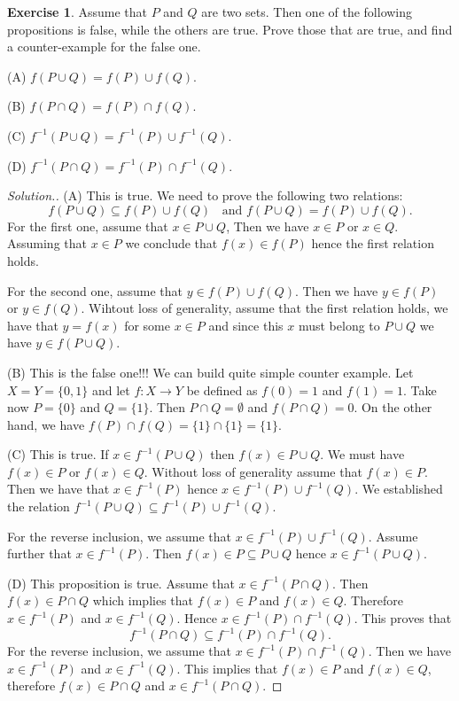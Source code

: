 \documentclass[11pt]{article}
\theoremstyle{definition}
\newtheorem{exer}[thm]{Exercise}
\theoremstyle{plain}
\begin{document}
\begin{exer}
Assume that \( P \) and \( Q \) are two sets. Then one of the following propositions is false, while the others are true. Prove those that are true, and find a counter-example for the false one.

(A) \( f(P \cup Q)=f(P)\cup f(Q) \).

(B) \( f(P\cap Q)=f(P)\cap f(Q) \).

(C) \( f^{-1}(P \cup Q)=f^{-1}(P)\cup f^{-1}(Q) \).

(D) \( f^{-1}(P\cap Q)=f^{-1}(P)\cap f^{-1}(Q) \).
\end{exer}
\begin{proof}[Solution.]
(A) This is true. We need to prove the following two relations: \[ f(P\cup Q)\subseteq f(P)\cup f(Q)\;\;\mbox{ and }f(P\cup Q)=f(P)\cup f(Q).\] For the first one, assume that \( x\in P\cup Q \), Then we have \( x\in P \) or \( x\in Q \). Assuming that \( x\in P \) we conclude that \( f(x)\in f(P) \) hence the first relation holds.

For the second one, assume that \( y\in f(P)\cup f(Q) \). Then we have \( y\in f(P) \) or \( y\in f(Q) \). Wihtout loss of generality, assume that the first relation holds, we have that \( y=f(x) \) for some \( x\in P \) and since this \( x \) must belong to \( P\cup Q \) we have \( y\in f(P\cup Q) \).

(B) This is the false one!!! We can build quite simple counter example. Let \( X=Y=\{0,1\} \) and let \( f:X\to Y \) be defined as \( f(0)=1 \) and \( f(1)=1 \). Take now \( P=\{0\} \) and \( Q=\{1\} \). Then \( P\cap Q=\emptyset \) and \( f(P\cap Q)=0 \). On the other hand, we have \( f(P)\cap f(Q)=\{1\}\cap \{1\}=\{1\} \).

(C) This is true. If \( x\in f^{-1}(P\cup Q) \) then \( f(x)\in P\cup Q \). We must have \( f(x)\in P \) or \( f(x)\in Q \). Without loss of generality assume that \( f(x)\in P \). Then we have that \( x\in f^{-1}(P) \) hence \( x\in f^{-1}(P)\cup f^{-1}(Q) \). We established the relation \( f^{-1}(P\cup Q)\subseteq f^{-1}(P)\cup f^{-1}(Q) \).

For the reverse inclusion, we assume that \( x\in f^{-1}(P)\cup f^{-1}(Q) \). Assume further that \( x\in f^{-1}(P) \). Then \( f(x)\in P\subseteq P\cup Q \) hence \( x\in f^{-1}(P\cup Q) \).

(D) This proposition is true. Assume that \( x\in f^{-1}(P\cap Q) \). Then \( f(x)\in P\cap Q \) which implies that \( f(x)\in P \) and \( f(x)\in Q \). Therefore \( x\in f^{-1}(P) \) and \( x\in f^{-1}(Q) \). Hence \( x\in f^{-1}(P)\cap f^{-1}(Q) \). This proves that \[ f^{-1}(P\cap Q)\subseteq f^{-1}(P)\cap f^{-1}(Q).\] For the reverse inclusion, we assume that \( x\in f^{-1}(P)\cap f^{-1}(Q) \). Then we have \( x\in f^{-1}(P) \) and \( x\in f^{-1}(Q) \). This implies that \( f(x)\in P \) and \( f(x)\in Q \), therefore \( f(x)\in P\cap Q \) and \( x\in f^{-1}(P\cap Q) \).
\end{proof}
\end{document}
